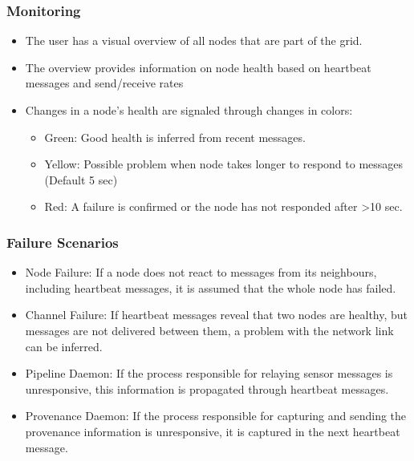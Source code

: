 \subsubsection{Monitoring}
\begin{itemize}
  \item The user has a visual overview of all nodes that are part of the grid.
  \item The overview provides information on node health based on heartbeat messages and send/receive rates
  \item Changes in a node's health are signaled through changes in colors:
	\begin{itemize}
	  \item Green: Good health is inferred from recent messages.
	  \item Yellow: Possible problem when node takes longer to respond to messages (Default 5 sec)
	  \item Red: A failure is confirmed or the node has not responded after >10 sec.
	\end{itemize}
\end{itemize}

\subsubsection{Failure Scenarios}
\begin{itemize}
  \item Node Failure: If a node does not react to messages from its neighbours, including heartbeat messages, it is assumed that the whole node has failed. 
  \item Channel Failure: If heartbeat messages reveal that two nodes are healthy, but messages are not delivered between them, a problem with the network link can be inferred.
  \item Pipeline Daemon: If the process responsible for relaying sensor messages is unresponsive, this information is propagated through heartbeat messages.
  \item Provenance Daemon: If the process responsible for capturing and sending the provenance information is unresponsive, it is captured in the next heartbeat message.
\end{itemize}

